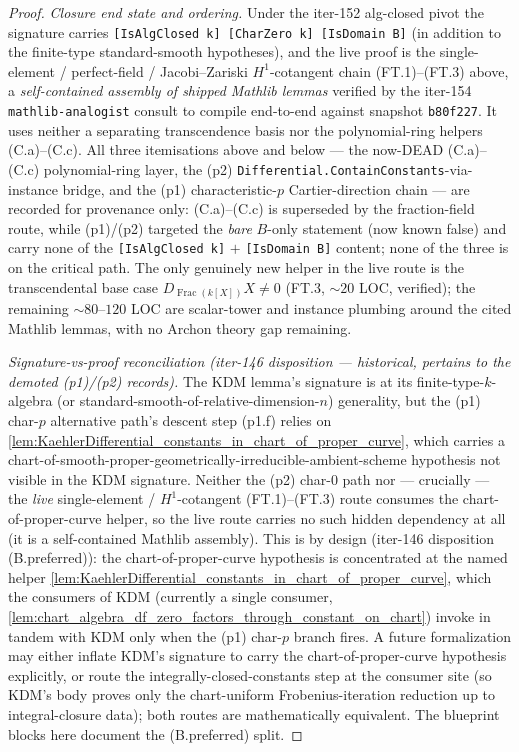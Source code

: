 \begin{proof}
  \emph{Closure end state and ordering.} Under the iter-152 alg-closed pivot the signature carries \texttt{[IsAlgClosed k] [CharZero k] [IsDomain B]} (in addition to the finite-type standard-smooth hypotheses), and the live proof is the single-element / perfect-field / Jacobi--Zariski \(H^1\)-cotangent chain (FT.1)--(FT.3) above, a \emph{self-contained assembly of shipped Mathlib lemmas} verified by the iter-154 \texttt{mathlib-analogist} consult to compile end-to-end against snapshot \texttt{b80f227}. It uses neither a separating transcendence basis nor the polynomial-ring helpers (C.a)--(C.c). All three itemisations above and below --- the now-DEAD (C.a)--(C.c) polynomial-ring layer, the (p2) \texttt{Differential.ContainConstants}-via-instance bridge, and the (p1) characteristic-\(p\) Cartier-direction chain --- are recorded for provenance only: (C.a)--(C.c) is superseded by the fraction-field route, while (p1)/(p2) targeted the \emph{bare} \(B\)-only statement (now known false) and carry none of the \texttt{[IsAlgClosed k]} \(+\) \texttt{[IsDomain B]} content; none of the three is on the critical path. The only genuinely new helper in the live route is the transcendental base case \(D_{\operatorname{Frac}(k[X])} X \neq 0\) (FT.3, \({\sim}20\) LOC, verified); the remaining \({\sim}80\)--\(120\) LOC are scalar-tower and instance plumbing around the cited Mathlib lemmas, with no Archon theory gap remaining.

  \emph{Signature-vs-proof reconciliation (iter-146 disposition --- historical, pertains to the demoted (p1)/(p2) records).} The KDM lemma's signature is at its finite-type-\(k\)-algebra (or standard-smooth-of-relative-dimension-\(n\)) generality, but the (p1) char-\(p\) alternative path's descent step (p1.f) relies on \cref{lem:KaehlerDifferential_constants_in_chart_of_proper_curve}, which carries a chart-of-smooth-proper-geometrically-irreducible-ambient-scheme hypothesis not visible in the KDM signature. Neither the (p2) char-\(0\) path nor --- crucially --- the \emph{live} single-element / \(H^1\)-cotangent (FT.1)--(FT.3) route consumes the chart-of-proper-curve helper, so the live route carries no such hidden dependency at all (it is a self-contained Mathlib assembly). This is by design (iter-146 disposition (B.preferred)): the chart-of-proper-curve hypothesis is concentrated at the named helper \cref{lem:KaehlerDifferential_constants_in_chart_of_proper_curve}, which the consumers of KDM (currently a single consumer, \cref{lem:chart_algebra_df_zero_factors_through_constant_on_chart}) invoke in tandem with KDM only when the (p1) char-\(p\) branch fires. A future formalization may either inflate KDM's signature to carry the chart-of-proper-curve hypothesis explicitly, or route the integrally-closed-constants step at the consumer site (so KDM's body proves only the chart-uniform Frobenius-iteration reduction up to integral-closure data); both routes are mathematically equivalent. The blueprint blocks here document the (B.preferred) split.


\end{proof}
